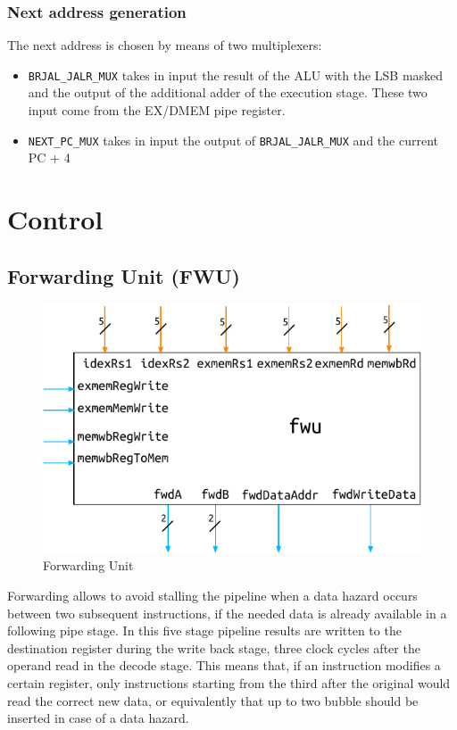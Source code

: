 \documentclass[a4paper]{article}
\begin{document}
\subsubsection{Next address generation}
The next address is chosen by means of two multiplexers:
\begin{itemize}
    \item \texttt{BRJAL\_JALR\_MUX} takes in input the result of the ALU with the LSB masked and the output of the additional adder of the execution stage. These two input come from the EX/DMEM pipe register.
    \item \texttt{NEXT\_PC\_MUX} takes in input the output of \texttt{BRJAL\_JALR\_MUX} and the current PC + 4
\end{itemize}

\section{Control}
\subsection{Forwarding Unit (FWU)}

\begin{figure}[hbtp]
    \centering
    \includegraphics[]{../fwu/ref/schematic/fwu.pdf}
    \caption{Forwarding Unit}
    \label{fig:fwu}
\end{figure}

Forwarding allows to avoid stalling the pipeline when a data hazard occurs between two subsequent instructions, if the needed data is already available in a following pipe stage.
In this five stage pipeline results are written to the destination register during the write back stage, three clock cycles after the operand read in the decode stage. This means that, if an instruction modifies a certain register, only instructions starting from the third after the original would read the correct new data, or equivalently that up to two bubble should be inserted in case of a data hazard.
\end{document}
